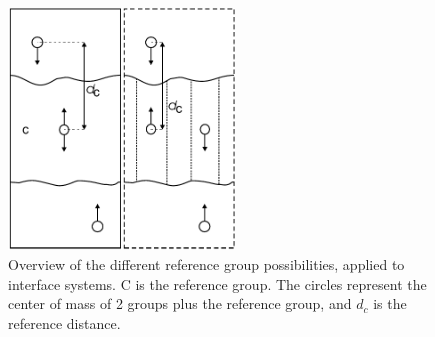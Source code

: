 \begin{figure}
\centerline{\includegraphics[width=6cm]{plots/pullref}}
\caption{Overview of the different reference group possibilities,
applied to interface systems. C is the reference group. The circles
represent the center of mass of 2 groups plus the reference group, and
$d_c$ is the reference distance.}
\label{fi:pullref} 
\end{figure}   

